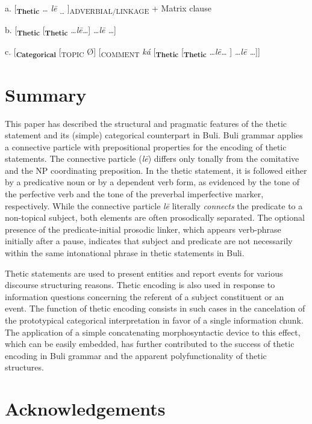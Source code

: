 \documentclass[output=paper]{langsci/langscibook}
\begin{document}
\ea\label{ex:schwarz:32}
{a.  [\textbf{\textsubscript{Thetic}} \textit{… l\={e}}\textsubscript{ …} ]\textsubscript{ADVERBIAL/LINKAGE} + Matrix clause} 

    b.   [\textbf{\textsubscript{Thetic}} [\textbf{\textsubscript{Thetic}} \textit{…l\={e}…}] \textit{…l\={e} …}]

    c.   [\textbf{\textsubscript{Categorical}}\textsubscript{} [\textsubscript{TOPIC} Ø]\textsubscript{} [\textsubscript{COMMENT}\textit{ ká} [\textbf{\textsubscript{Thetic}} [\textbf{\textsubscript{Thetic}} \textit{…l\={e}…} ] \textit{…l\={e} …}]]
\z

\section{Summary}\label{sec:schwarz:4}

This paper has described the structural and pragmatic features of the thetic statement and its (simple) categorical counterpart in Buli. Buli grammar applies a connective particle with prepositional properties for the encoding of thetic statements. The connective particle (\textit{l\={e}}) differs only tonally from the comitative and the NP coordinating preposition. In the thetic statement, it is followed either by a predicative noun or by a dependent verb form, as evidenced by the tone of the perfective verb and the tone of the preverbal imperfective marker, respectively. While the connective particle\textit{ l\={e}} literally \textit{connects} the predicate to a non-topical subject, both elements are often prosodically separated. The optional presence of the predicate-initial prosodic linker, which appears verb-phrase initially after a pause, indicates that subject and predicate are not necessarily within the same intonational phrase in thetic statements in Buli. 

Thetic statements are used to present entities and report events for various discourse structuring reasons. Thetic encoding is also used in response to information questions concerning the referent of a subject constituent or an event. The function of thetic encoding consists in such cases in the cancelation of the prototypical categorical interpretation in favor of a single information chunk. The application of a simple concatenating morphosyntactic device to this effect, which can be easily embedded, has further contributed to the success of thetic encoding in Buli grammar and the apparent polyfunctionality of thetic structures. 

\section*{ Acknowledgements} 
\end{document}
